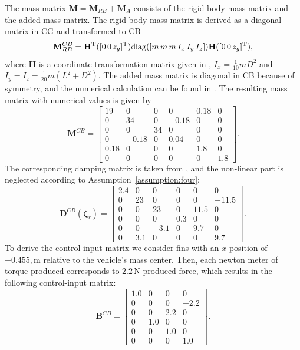 The mass matrix $\mathbf{M} = \mathbf{M}_{RB} + \mathbf{M}_A$ consists of the rigid body mass matrix and the added mass matrix. The rigid body mass matrix is derived as a diagonal matrix in CG and transformed to CB
\begin{equation}
    \mathbf{M}_{RB}^{CB} = \mathbf{H}^{\rm T}([0\,0\,z_g]^{\rm T}) \mathrm{diag}([m\, m\, m\, I_x\, I_y \, I_z]) \mathbf{H}([0\,0\,z_g]^{\rm T}),
\end{equation}
where $\mathbf{H}$ is a coordinate transformation matrix given in \cite[Appendix C]{fossen_handbook_2021}, $I_x = \tfrac{1}{10} m D^2$ and $I_y=I_z = \tfrac{1}{20}m (L^2+D^2)$. The added mass matrix is diagonal in CB because of symmetry, and the numerical calculation can be found in \cite[Section 8.4]{fossen_handbook_2021}. The resulting mass matrix with numerical values is given by
\begin{equation}\label{eq:M_CB}
    \mathbf{M}^{CB} = \begin{bmatrix}
19 & 0 & 0 & 0 & 0.18 & 0 \\
0 & 34 & 0 & -0.18 & 0 & 0 \\
0 & 0 & 34 & 0 & 0 & 0 \\
0 & -0.18 & 0 & 0.04 & 0 & 0 \\
0.18 & 0 & 0 & 0 & 1.8 & 0 \\
0 & 0 & 0 & 0 & 0 & 1.8
\end{bmatrix}.
\end{equation}
The corresponding damping matrix is taken from \cite{estrela_da_silva_modeling_2007}, and the non-linear part is neglected according to Assumption~\ref{assumption:four}:
\begin{equation}
\mathbf{D}^{CB}(\bm{\zeta}_r) =
\begin{bmatrix}
2.4 & 0 & 0 & 0 & 0 & 0 \\
0 & 23 & 0 & 0 & 0 & -11.5\\
0 & 0 & 23 & 0 & 11.5 & 0 \\
0 & 0 & 0 & 0.3 & 0 & 0 \\
0 & 0 & -3.1 & 0 & 9.7 & 0 \\
0 & 3.1 & 0 & 0 & 0 & 9.7
\end{bmatrix}.
\end{equation}
To derive the control-input matrix we consider fins with an $x$-position of $-0.455, \mathrm{m}$ relative to the vehicle's mass center. Then, each newton meter of torque produced corresponds to $2.2\, \mathrm{N}$ produced force, which results in the following control-input matrix:\enlargethispage*{\baselineskip}
\begin{equation}
\mathbf{B}^{CB} = \begin{bmatrix}
1.0 & 0 & 0 & 0 \\
0 & 0 & 0 & -2.2 \\
0 & 0 & 2.2 & 0 \\
0 & 1.0 & 0 & 0 \\
0 & 0 & 1.0 & 0 \\
0 & 0 & 0 & 1.0
\end{bmatrix}.
\end{equation}



